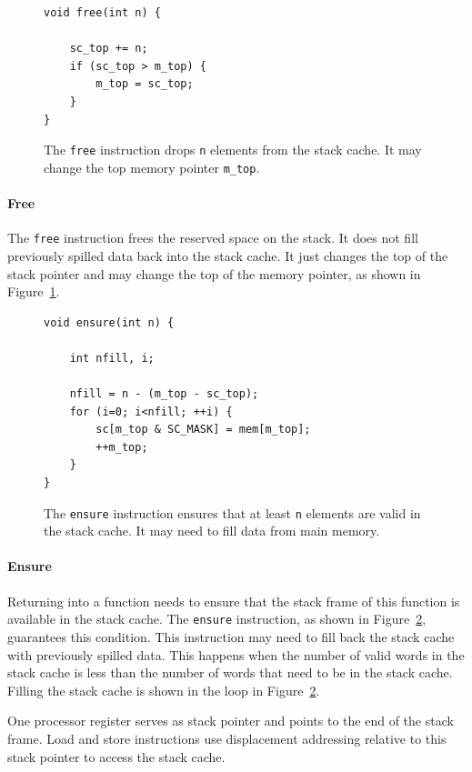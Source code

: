 \documentclass[a4paper,fontsize=10pt,twoside,DIV15,BCOR12mm,headinclude=true,footinclude=false,pagesize,bibtotoc]{scrbook}
\newcommand{\code}[1]{{\texttt{#1}}}
\begin{document}
\begin{figure}
\begin{lstlisting}
void free(int n) {

    sc_top += n;
    if (sc_top > m_top) {
        m_top = sc_top;
    }
}
\end{lstlisting}
	\caption{The \code{free} instruction drops \code{n}
	elements from the stack cache. It may change the top memory
	pointer \code{m\_top}.}
 	 \label{fig:free_iml}
\end{figure}

\paragraph{Free} The \code{free} instruction frees the reserved
space on the stack. It does not fill previously spilled data back into the stack cache.
It just changes the top of the stack pointer and may change the top of the memory
pointer, as shown in Figure~\ref{fig:free_iml}.


\begin{figure}
\begin{lstlisting}
void ensure(int n) {

    int nfill, i;

    nfill = n - (m_top - sc_top);
    for (i=0; i<nfill; ++i) {
        sc[m_top & SC_MASK] = mem[m_top];
        ++m_top;
    }
}
\end{lstlisting}
	\caption{The \code{ensure} instruction ensures that
	at least \code{n} elements are valid in the stack cache.
	It may need to fill data from main memory.}
 	\label{fig:ens_iml}
\end{figure}

\paragraph{Ensure} Returning into a function needs to ensure that the stack
frame of this function is available in the stack cache. The \code{ensure} instruction,
as shown in Figure~\ref{fig:ens_iml}, guarantees this condition.
This instruction may need to fill back the stack cache with previously spilled data.
This happens when the number of valid words in the stack cache is less than the
number of words that need to be in the stack cache.
Filling the stack cache is shown in the loop in Figure~\ref{fig:ens_iml}.

One processor register serves as stack pointer and points to the end of the stack frame.
Load and store instructions use displacement addressing relative to this stack pointer
to access the stack cache.
\end{document}
